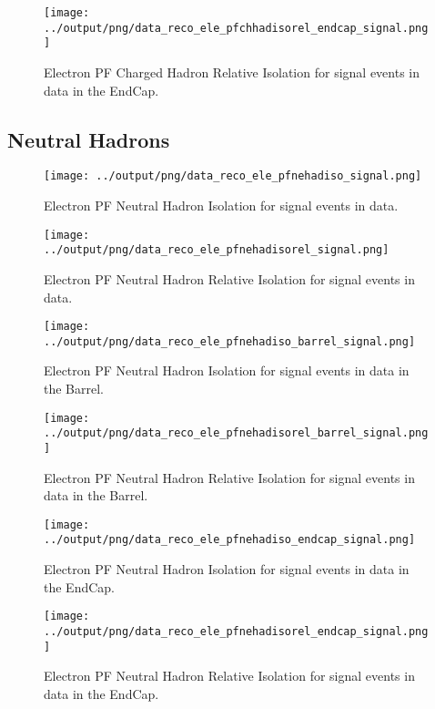 \documentclass[11pt]{book}
\begin{document}
\begin{figure}[htb]
\centering
\texttt{[image: ../output/png/data\_reco\_ele\_pfchhadisorel\_endcap\_signal.png]}
\caption{Electron PF Charged Hadron Relative Isolation for signal events in data in the EndCap.}
\label{fig:data_ele_pfchhadisorel_endcap_signal}
\end{figure}
\clearpage

\subsection{Neutral Hadrons}
\begin{figure}[htb]
\centering
\texttt{[image: ../output/png/data\_reco\_ele\_pfnehadiso\_signal.png]}
\caption{Electron PF Neutral Hadron Isolation for signal events in data.}
\label{fig:data_ele_pfnehadiso_signal}
\end{figure}

\begin{figure}[htb]
\centering
\texttt{[image: ../output/png/data\_reco\_ele\_pfnehadisorel\_signal.png]}
\caption{Electron PF Neutral Hadron Relative Isolation for signal events in data.}
\label{fig:data_ele_pfnehadisorel_signal}
\end{figure}

\begin{figure}[htb]
\centering
\texttt{[image: ../output/png/data\_reco\_ele\_pfnehadiso\_barrel\_signal.png]}
\caption{Electron PF Neutral Hadron Isolation for signal events in data in the Barrel.}
\label{fig:data_ele_pfnehadiso_barrel_signal}
\end{figure}

\begin{figure}[htb]
\centering
\texttt{[image: ../output/png/data\_reco\_ele\_pfnehadisorel\_barrel\_signal.png]}
\caption{Electron PF Neutral Hadron Relative Isolation for signal events in data in the Barrel.}
\label{fig:data_ele_pfnehadisorel_barrel_signal}
\end{figure}

\begin{figure}[htb]
\centering
\texttt{[image: ../output/png/data\_reco\_ele\_pfnehadiso\_endcap\_signal.png]}
\caption{Electron PF Neutral Hadron Isolation for signal events in data in the EndCap.}
\label{fig:data_ele_pfnehadiso_endcap_signal}
\end{figure}

\begin{figure}[htb]
\centering
\texttt{[image: ../output/png/data\_reco\_ele\_pfnehadisorel\_endcap\_signal.png]}
\caption{Electron PF Neutral Hadron Relative Isolation for signal events in data in the EndCap.}
\label{fig:data_ele_pfnehadisorel_endcap_signal}
\end{figure}
\clearpage
\end{document}
